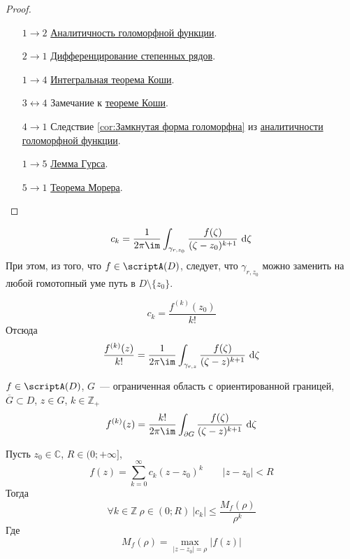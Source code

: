 \documentclass{article}
\begin{document}
    \begin{proof}
        \begin{itemize}
            \item[$1\to2$] \hyperref[Голоморфная функция аналитична]{Аналитичность голоморфной функции}.
            \item[$2\to1$] \hyperref[Дифференцирование степенных рядов]{Дифференцирование степенных рядов}.
            \item[$1\to4$] \hyperref[Интегральная теорема Коши]{Интегральная теорема Коши}.
            \item[$3\leftrightarrow4$] Замечание к \hyperref[Интегральная теорема Коши]{теореме Коши}.
            \item[$4\to1$] Следствие \ref{cor:Замкнутая форма голоморфна} из \hyperref[Голоморфная функция аналитична]{аналитичности голоморфной функции}.
            \item[$1\to5$] \hyperref[Лемма Гурса]{Лемма Гурса}.
            \item[$5\to1$] \hyperref[Теорема Морера]{Теорема Морера}.
        \end{itemize}
    \end{proof}
    \begin{remark}
        $$
        c_k=\frac1{2\pi\im}\int_{\gamma_{r,z_0}}\frac{f(\zeta)}{(\zeta-z_0)^{k+1}}~\mathrm d\zeta
        $$
        При этом, из того, что $f\in\scriptA(D)$, следует, что $\gamma_{r,z_0}$ можно заменить на любой гомотопный уме путь в $D\setminus\{z_0\}$.
    \end{remark}
    \begin{claim}
        $$c_k=\frac{f^{(k)}(z_0)}{k!}$$
        Отсюда
        $$\frac{f^{(k)}(z)}{k!}=\frac1{2\pi\im}\int_{\gamma_{r,z}}\frac{f(\zeta)}{(\zeta-z)^{k+1}}~\mathrm d\zeta$$
    \end{claim}
    \begin{claim}
        $f\in\scriptA(D)$, $G$~--- ограниченная область с ориентированной границей, $\overline G\subset D$, $z\in G$, $k\in\mathbb Z_+$
        $$
        f^{(k)}(z)=\frac{k!}{2\pi\im}\int_{\partial G}\frac{f(\zeta)}{(\zeta-z)^{k+1}}~\mathrm d\zeta
        $$
    \end{claim}
    \begin{lemma}
        \label{Неравенства Коши для коэффициентов степенного ряда}
        Пусть $z_0\in\mathbb C$, $R\in(0;+\infty]$,
        $$
        f(z)=\sum\limits_{k=0}^\infty c_k(z-z_0)^k\qquad |z-z_0|<R
        $$
        Тогда
        $$
        \forall k\in\mathbb Z~\rho\in(0;R)~|c_k|\leqslant\frac{M_f(\rho)}{\rho^k}
        $$
        Где
        $$
        M_f(\rho)=\max\limits_{|z-z_0|=\rho}|f(z)|
        $$
    \end{lemma}
\end{document}
